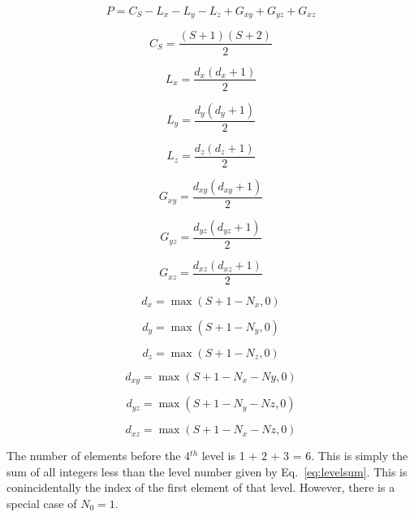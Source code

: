 \begin{equation}\label{eq:taskspersub}
P = C_S - L_x - L_y - L_z + G_{xy} + G_{yz} + G_{xz}
\end{equation}

\begin{equation}
C_S = \frac{(S+1)(S+2)}{2}
\end{equation}

\begin{equation}
L_x = \frac{d_x(d_x+1)}{2}
\end{equation}

\begin{equation}
L_y = \frac{d_y(d_y+1)}{2}
\end{equation}

\begin{equation}
L_z = \frac{d_z(d_z+1)}{2}
\end{equation}

\begin{equation}
G_{xy} = \frac{d_{xy}(d_{xy}+1)}{2}
\end{equation}

\begin{equation}
G_{yz} = \frac{d_{yz}(d_{yz}+1)}{2}
\end{equation}

\begin{equation}
G_{xz} = \frac{d_{xz}(d_{xz}+1)}{2}
\end{equation}

\begin{equation}
d_x = \max(S+1-N_x, 0)
\end{equation}

\begin{equation}
d_y = \max(S+1-N_y, 0)
\end{equation}

\begin{equation}
d_z = \max(S+1-N_z, 0)
\end{equation}

\begin{equation}
d_{xy} = \max(S+1-N_x - Ny, 0)
\end{equation}

\begin{equation}
d_{yz} = \max(S+1-N_y - Nz, 0)
\end{equation}

\begin{equation}
d_{xz} = \max(S+1-N_x - Nz, 0)
\end{equation}

The number of elements before the 4$^{th}$ level is 1 + 2 + 3 = 6. This is simply the sum of all integers less than the level number given by Eq.~\ref{eq:levelsum}. This is conincidentally the index of the first element of that level. However, there is a special case of $N_0 = 1$.

